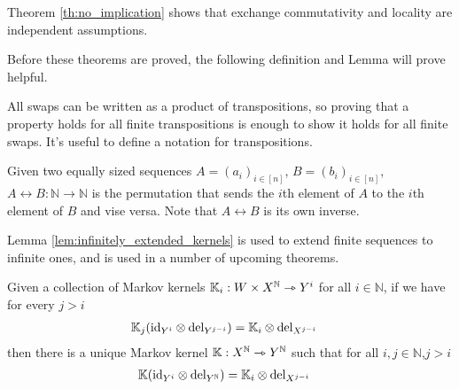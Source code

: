 Theorem \ref{th:no_implication} shows that exchange commutativity and locality are independent assumptions.

Before these theorems are proved, the following definition and Lemma will prove helpful.

All swaps can be written as a product of transpositions, so proving that a property holds for all finite transpositions is enough to show it holds for all finite swaps. It's useful to define a notation for transpositions.
\begin{definition}
Given two equally sized sequences $A=(a_i)_{i\in [n]}$, $B=(b_i)_{i\in [n]}$, ${A\leftrightarrow B}:\mathbb{N}\to \mathbb{N}$ is the permutation that sends the $i$th element of $A$ to the $i$th element of $B$ and vise versa. Note that $A\leftrightarrow B$ is its own inverse.
\end{definition}

Lemma \ref{lem:infinitely_extended_kernels} is used to extend finite sequences to infinite ones, and is used in a number of upcoming theorems.

\begin{lemma}\label{lem:infinitely_extended_kernels}
Given a collection of Markov kernels $\mathbb{K}_i:W\times X^{\mathbb{N}}\rightarrowtriangle Y^i$ for all $i\in \mathbb{N}$, if we have for every $j>i$
\begin{align}
    \mathbb{K}_j(\text{id}_{Y^i}\otimes \text{del}_{Y^{j-i}}) &= \mathbb{K}_i\otimes \text{del}_{X^{j-i}}\label{eq:marginalise_comb}
\end{align} 
then there is a unique Markov kernel $\mathbb{K}:X^{\mathbb{N}}\rightarrowtriangle Y^{\mathbb{N}}$ such that for all $i,j\in \mathbb{N}$,$j>i$
\begin{align}
    \mathbb{K}(\text{id}_{Y^i}\otimes \text{del}_{Y^{\mathbb{N}}})&= \mathbb{K}_i\otimes \text{del}_{X^{j-i}}
\end{align}
\end{lemma}

